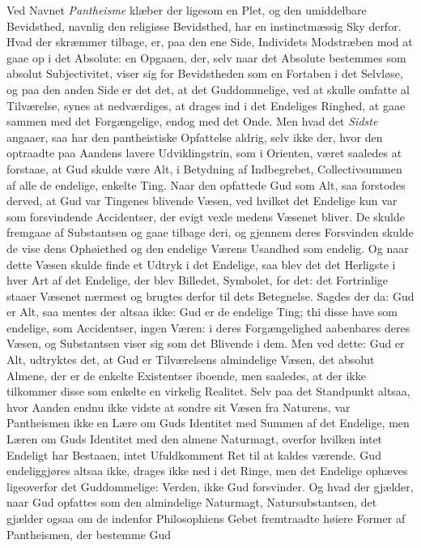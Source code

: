 Ved Navnet \emph{Pantheisme} klæber der ligesom en Plet, og den umiddelbare
Bevidsthed, navnlig den religiøse Bevidsthed, har en instinctmæssig Sky derfor.
Hvad der skræmmer tilbage, er, paa den ene Side, Individets Modstræben mod at
gaae op i det Absolute: en Opgaaen, der, selv naar det Absolute bestemmes som
absolut Subjectivitet, viser sig for Bevidstheden som en Fortaben i det
Selvløse, og paa den anden Side er det det, at det Guddommelige, ved at skulle
omfatte al Tilværelse, synes at nedværdiges, at drages ind i det Endeliges
Ringhed, at gaae sammen med det Forgængelige, endog med det Onde. Men hvad det
\emph{Sidste}
 angaaer, saa har den pantheistiske Opfattelse aldrig, selv ikke der, hvor den
optraadte paa Aandens lavere Udviklingstrin, som i Orienten, været saaledes at
forstaae, at Gud skulde være Alt, i Betydning af Indbegrebet, Collectivsummen
af alle de endelige, enkelte Ting. Naar den opfattede Gud som Alt, saa
forstodes derved, at Gud var Tingenes blivende Væsen, ved hvilket det Endelige
kun var som forsvindende Accidentser, der evigt vexle medens Væsenet bliver. De
skulde fremgaae af Substantsen og gaae tilbage deri, og gjennem deres
Forsvinden skulde de vise dens Ophøiethed og den endelige Værens Usandhed som
endelig. Og naar dette Væsen skulde finde et Udtryk i det Endelige, saa blev
det det Herligste i hver Art af det Endelige, der blev Billedet, Symbolet, for
det: det Fortrinlige staaer Væsenet nærmest og brugtes derfor til dets
Betegnelse. Sagdes der da: Gud er Alt, saa mentes der altsaa ikke: Gud er de
endelige Ting; thi disse have som endelige, som Accidentser, ingen Væren: i
deres Forgængelighed aabenbares deres Væsen, og Substantsen viser sig som det
Blivende i dem. Men ved dette: Gud er Alt, udtryktes det, at Gud er
Tilværelsens almindelige Væsen, det absolut Almene, der er de enkelte
Existentser iboende, men saaledes, at der ikke tilkommer disse som enkelte en
virkelig Realitet. Selv paa det Standpunkt altsaa, hvor Aanden endnu ikke
vidste at sondre sit Væsen fra Naturens, var Pantheismen ikke en Lære om Guds
Identitet med Summen af det Endelige, men Læren om Guds Identitet med den
almene Naturmagt, overfor hvilken intet Endeligt har Bestaaen, intet
Ufuldkomment Ret til at kaldes værende. Gud endeliggjøres altsaa ikke, drages
ikke ned i det Ringe, men det Endelige ophæves ligeoverfor det Guddommelige:
Verden, ikke Gud forsvinder. Og hvad der gjælder, naar Gud opfattes som den
almindelige Naturmagt, Natursubstantsen, det gjælder ogsaa om de indenfor
Philosophiens Gebet fremtraadte høiere Former af Pantheismen, der bestemme Gud
